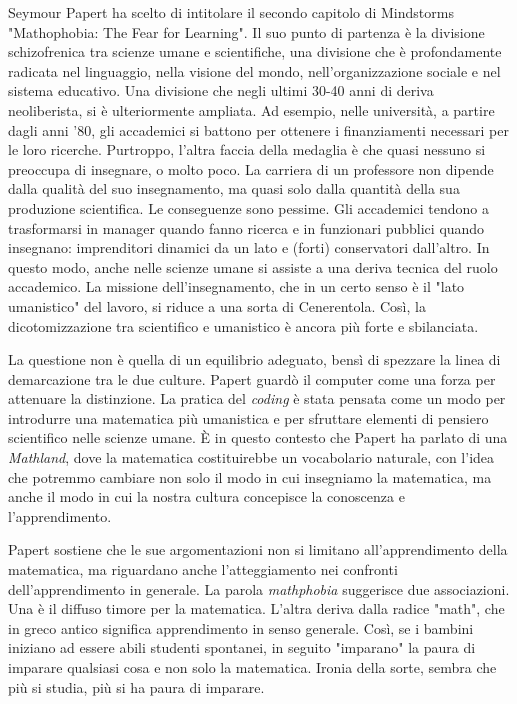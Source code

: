 Seymour Papert ha scelto di intitolare il secondo capitolo di Mindstorms "Mathophobia: The Fear for Learning". Il suo punto di partenza è la divisione schizofrenica tra scienze umane e scientifiche, una divisione che è profondamente radicata nel linguaggio, nella visione del mondo, nell'organizzazione sociale e nel sistema educativo. Una divisione che negli ultimi 30-40 anni di deriva neoliberista, si è ulteriormente ampliata. Ad esempio, nelle università, a partire dagli anni '80, gli accademici si battono per ottenere i finanziamenti necessari per le loro ricerche. Purtroppo, l'altra faccia della medaglia è che quasi nessuno si preoccupa di insegnare, o molto poco. La carriera di un professore non dipende dalla qualità del suo insegnamento, ma quasi solo dalla quantità della sua produzione scientifica. Le conseguenze sono pessime. Gli accademici tendono a trasformarsi in manager quando fanno ricerca e in funzionari pubblici quando insegnano: imprenditori dinamici da un lato e (forti) conservatori dall'altro. In questo modo, anche nelle scienze umane si assiste a una deriva tecnica del ruolo accademico. La missione dell'insegnamento, che in un certo senso è il "lato umanistico" del lavoro, si riduce a una sorta di Cenerentola. Così, la dicotomizzazione tra scientifico e umanistico è ancora più forte e sbilanciata.

La questione non è quella di un equilibrio adeguato, bensì di spezzare la linea di demarcazione tra le due culture. Papert guardò il computer come una forza per attenuare la distinzione. La pratica del \textit{coding} è stata pensata come un modo per introdurre una matematica più umanistica e per sfruttare elementi di pensiero scientifico nelle scienze umane. È in questo contesto che Papert ha parlato di una \textit{Mathland}, dove la matematica costituirebbe un vocabolario naturale, con l'idea che potremmo cambiare non solo il modo in cui insegniamo la matematica, ma anche il modo in cui la nostra cultura concepisce la conoscenza e l'apprendimento.

Papert sostiene che le sue argomentazioni non si limitano all'apprendimento della matematica, ma riguardano anche l'atteggiamento nei confronti dell'apprendimento in generale. La parola \textit{mathphobia} suggerisce due associazioni. Una è il diffuso timore per la matematica. L'altra deriva dalla radice "math", che in greco antico significa apprendimento in senso generale. Così, se i bambini iniziano ad essere abili studenti spontanei, in seguito "imparano" la paura di imparare qualsiasi cosa e non solo la matematica. Ironia della sorte, sembra che più si studia, più si ha paura di imparare.

